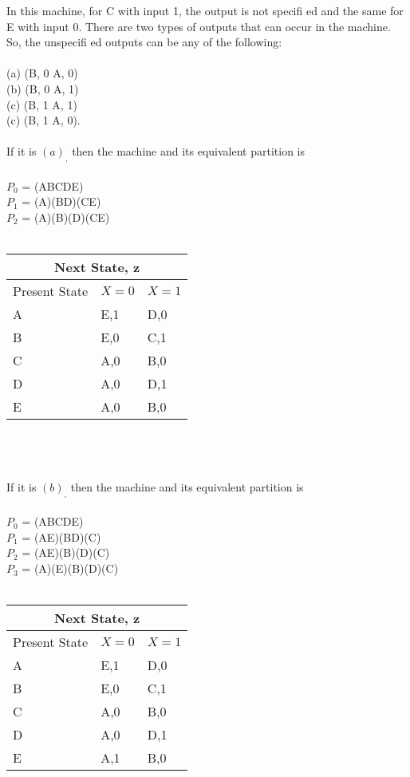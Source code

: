 \documentclass[12pt,a4paper,openany]{book}
\begin{document}
In this machine, for C with input 1, the output is not speciﬁ ed and the same for E with input 0. There are two types of outputs that can occur in the machine. So, the unspeciﬁ ed outputs can be any of the following:
\\
\\
(a) (B, 0   A, 0)
\\
(b) (B, 0   A, 1)
\\
(c) (B, 1   A, 1)
\\
(c) (B, 1   A, 0).
\\
\\
If it is $(a)_,$ then the machine and its equivalent partition is
\\
\\
$P_0$ = (ABCDE)
\\
$P_1$ = (A)(BD)(CE)
\\
$P_2$ = (A)(B)(D)(CE) 
\\
\\
\begin{tabular}{ |p{3cm}|p{2cm}|p{2cm}|}
\hline
\multicolumn{3}{|c|}{Next State, z} \\
\hline
Present State  &   $X = 0$        &  $X = 1$   \\
\hline
A  &   E,1  &   D,0   \\
B  &   E,0  &   C,1    \\
C  &   A,0   &   B,0   \\
D  &   A,0  &  D,1     \\
E  &   A,0    &  B,0     \\
\hline
\end{tabular}
\\
\\
\\
If it is $(b)_,$ then the machine and its equivalent partition is
\\
\\
$P_0$ = (ABCDE)
\\
$P_1$ = (AE)(BD)(C)
\\
$P_2$ = (AE)(B)(D)(C)
\\
$P_3$ = (A)(E)(B)(D)(C)
\\
\\
\begin{tabular}{ |p{3cm}|p{2cm}|p{2cm}|}
\hline
\multicolumn{3}{|c|}{Next State, z} \\
\hline
Present State  &   $X = 0$        &  $X = 1$   \\
\hline
A  &   E,1  &   D,0   \\
B  &   E,0  &   C,1    \\
C  &   A,0   &   B,0   \\
D  &   A,0  &  D,1     \\
E  &   A,1    &  B,0     \\
\hline
\end{tabular}
\end{document}
